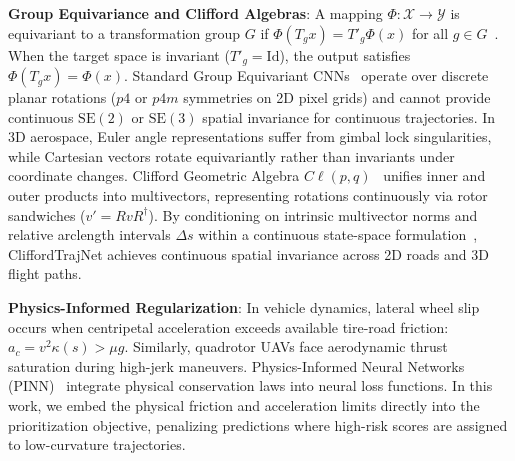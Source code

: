 \textbf{Group Equivariance and Clifford Algebras}: 
A mapping $\Phi: \mathcal{X} \to \mathcal{Y}$ is equivariant to a transformation group $G$ if $\Phi(T_g x) = T'_g \Phi(x)$ for all $g \in G$~\cite{gcnn}.
When the target space is invariant ($T'_g = \mathrm{Id}$), the output satisfies $\Phi(T_g x) = \Phi(x)$.
Standard Group Equivariant CNNs~\cite{gcnn} operate over discrete planar rotations ($p4$ or $p4m$ symmetries on 2D pixel grids) and cannot provide continuous $\mathrm{SE}(2)$ or $\mathrm{SE}(3)$ spatial invariance for continuous trajectories.
In 3D aerospace, Euler angle representations suffer from gimbal lock singularities, while Cartesian vectors rotate equivariantly rather than invariants under coordinate changes.
Clifford Geometric Algebra $C\ell(p, q)$~\cite{dorst} unifies inner and outer products into multivectors, representing rotations continuously via rotor sandwiches ($v' = R v R^\dagger$).
By conditioning on intrinsic multivector norms and relative arclength intervals $\Delta s$ within a continuous state-space formulation~\cite{mamba}, CliffordTrajNet achieves continuous spatial invariance across 2D roads and 3D flight paths.

\textbf{Physics-Informed Regularization}:
In vehicle dynamics, lateral wheel slip occurs when centripetal acceleration exceeds available tire-road friction: $a_c = v^2 \kappa(s) > \mu g$.
Similarly, quadrotor UAVs face aerodynamic thrust saturation during high-jerk maneuvers.
Physics-Informed Neural Networks (PINN)~\cite{pinn} integrate physical conservation laws into neural loss functions.
In this work, we embed the physical friction and acceleration limits directly into the prioritization objective, penalizing predictions where high-risk scores are assigned to low-curvature trajectories.
